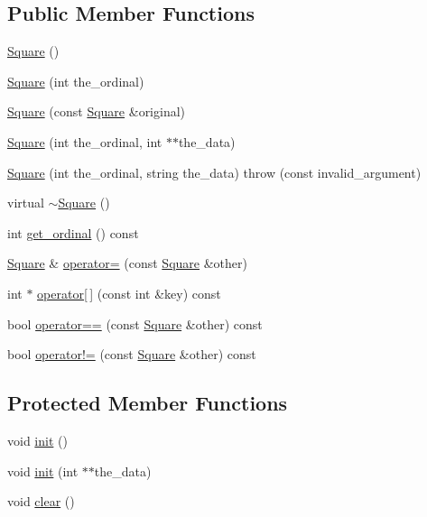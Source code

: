 \subsection*{Public Member Functions}
\begin{DoxyCompactItemize}
\item 
\hyperlink{classSquare_a3dc7ff9aefc2725172b5d3153973d243}{Square} ()
\item 
\hyperlink{classSquare_a687fd93a7b5b6f4e310dda4765f2e4b9}{Square} (int the\-\_\-ordinal)
\item 
\hyperlink{classSquare_a5b24c398bbcd2fa54d750e821b682be4}{Square} (const \hyperlink{classSquare}{Square} \&original)
\item 
\hyperlink{classSquare_ab2ce549e03ee04a325fde6fa69b0bd56}{Square} (int the\-\_\-ordinal, int $\ast$$\ast$the\-\_\-data)
\item 
\hyperlink{classSquare_a6aaedd8907eb79371c1a964c22a91df1}{Square} (int the\-\_\-ordinal, string the\-\_\-data)  throw (const invalid\-\_\-argument)
\item 
virtual \hyperlink{classSquare_a90af7ce1060cff7b717ceddb333846b8}{$\sim$\-Square} ()
\item 
int \hyperlink{classSquare_aa88af87efb77891af13d7e51875c8a4d}{get\-\_\-ordinal} () const 
\item 
\hyperlink{classSquare}{Square} \& \hyperlink{classSquare_aefd7f1993a8a7dc2da19773aa615d4e5}{operator=} (const \hyperlink{classSquare}{Square} \&other)
\item 
int $\ast$ \hyperlink{classSquare_a7dfc1c4829599e231ad72d1f2b6d0e83}{operator\mbox{[}$\,$\mbox{]}} (const int \&key) const 
\item 
bool \hyperlink{classSquare_a68344a4bfb9a5bc8b6382f302049ec6f}{operator==} (const \hyperlink{classSquare}{Square} \&other) const 
\item 
bool \hyperlink{classSquare_a62325c38089124501ce08ddf2fb7a4eb}{operator!=} (const \hyperlink{classSquare}{Square} \&other) const 
\end{DoxyCompactItemize}
\subsection*{Protected Member Functions}
\begin{DoxyCompactItemize}
\item 
void \hyperlink{classSquare_af7e972a99bbd1229c1a2ed9c9973b1a3}{init} ()
\item 
void \hyperlink{classSquare_ad8a97711bb0377c85707f926c715149a}{init} (int $\ast$$\ast$the\-\_\-data)
\item 
void \hyperlink{classSquare_a613cdeed3d18a22bd212431d0c1d3b3d}{clear} ()
\end{DoxyCompactItemize}

